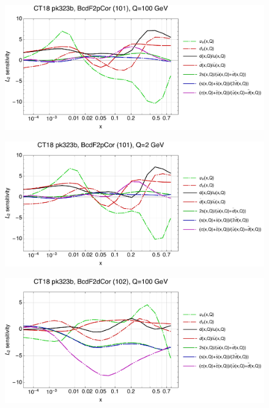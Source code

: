 \documentclass[10pt,aps,prd,floatfix,titlepage]{revtex4}
\begin{document}
\clearpage
\begin{figure}
\includegraphics[width=\textwidth,height=0.44\textheight,keepaspectratio]{2/101_ct18nn_q100_Sf_2.pdf}
\caption{}
\end{figure}
\begin{figure}
\includegraphics[width=\textwidth,height=0.44\textheight,keepaspectratio]{2/101_ct18nn_q2_Sf_2.pdf}
\caption{}
\end{figure}
\clearpage
\begin{figure}
\includegraphics[width=\textwidth,height=0.44\textheight,keepaspectratio]{2/102_ct18nn_q100_Sf_2.pdf}
\caption{}
\end{figure}
\end{document}
